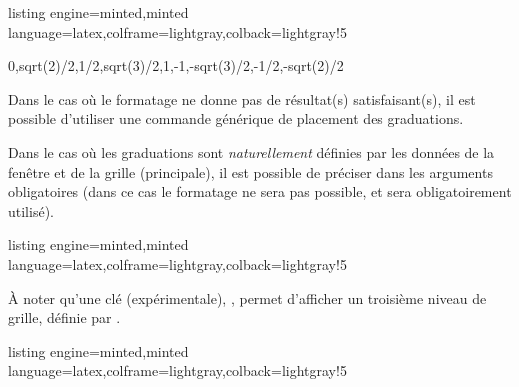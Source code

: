 \documentclass[11pt,a4paper]{ltxdoc}
\begin{document}
\begin{tcblisting}{listing engine=minted,minted language=latex,colframe=lightgray,colback=lightgray!5}
\begin{GraphiqueTikz}%
  [x=2.75cm,y=3cm,
  Xmin=0,Xmax=3.5,Xgrille=pi/12,Xgrilles=pi/24,
  Ymin=-1.05,Ymax=1.05,Ygrille=0.2,Ygrilles=0.05]
    {0,sqrt(2)/2,1/2,sqrt(3)/2,1,-1,-sqrt(3)/2,-1/2,-sqrt(2)/2}
\end{GraphiqueTikz}
\end{tcblisting}

Dans le cas où le formatage ne donne pas de résultat(s) satisfaisant(s), il est possible d'utiliser une commande générique de placement des graduations.

\pagebreak

Dans le cas où les graduations sont \textit{naturellement} définies par les données de la fenêtre et de la grille (principale), il est possible de préciser  dans les arguments obligatoires (dans ce cas le formatage ne sera pas possible, et  sera obligatoirement utilisé).

\begin{tcblisting}{listing engine=minted,minted language=latex,colframe=lightgray,colback=lightgray!5}
\begin{GraphiqueTikz}%
  [x=1.5cm,y=6cm,Xmin=0,Xmax=7,Xgrille=0.5,Xgrilles=0.25,
  Ymin=0,Ymax=1,Ygrille=0.1,Ygrilles=0.05]
\end{GraphiqueTikz}
\end{tcblisting}

À noter qu'une clé (expérimentale), , permet d'afficher un troisième niveau de grille, définie par \MontreCode{[Xgrillei=...,Ygrillei=...]}.

\begin{tcblisting}{listing engine=minted,minted language=latex,colframe=lightgray,colback=lightgray!5}
\begin{GraphiqueTikz}%
  [x=1.5cm,y=6cm,Xmin=0,Xmax=7,Xgrille=0.5,Xgrillei=0.25,Xgrilles=0.05,
  Ymin=0,Ymax=1,Ygrille=0.1,Ygrillei=0.05,Ygrilles=0.01]
\end{GraphiqueTikz}
\end{tcblisting}

\pagebreak
\end{document}

